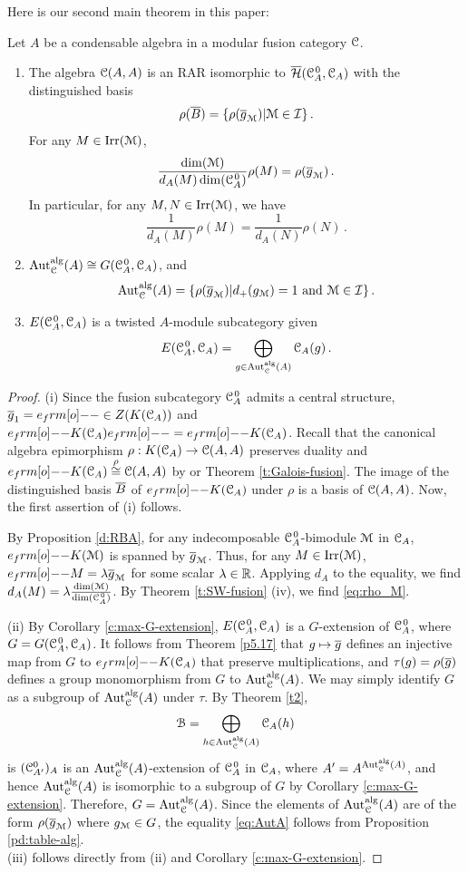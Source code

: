 \documentclass{amsart}
\begin{document}
Here is our second main theorem in this paper: 
\begin{thm}\label{t:main2}
    Let $A$ be a condensable algebra in a modular fusion category $\CC$. 
    \begin{enumerate} 
    \item The algebra $\CC(A,A)$ is an RAR isomorphic to
    $\oHA$ with the distinguished basis $$\rho(\ol B) = \{\rho(\ogm)|\MM \in\I\}\,.$$ 
    For any $M \in \irr(\MM)$, 
    \begin{equation} \label{eq:rho_M}
    \frac{\dim(\MM)}{d_A(M)\dim(\CAo)} \rho(M) = \rho(\ogm)\,.
    \end{equation}
    In particular, for any $M,N \in \irr(\MM)$, we have
    $$
\frac{1}{d_A(M)} \rho(M) = \frac{1}{d_A(N)} \rho(N)\,.
    $$
    \item  $\Auta(A) \cong G(\CAo,\CA)$, and
    \begin{equation} \label{eq:AutA}
    \Auta(A)=\{\rho(\ogm)|d_+(\gm)=1 \text{ and }\MM \in \I \} \,.
    \end{equation}
    \item $\ECA$ is a twisted $A$-module subcategory given
    $$
    \ECA = \bigoplus_{g \in \Auta(A)} \CA(g)\,.
    $$    
    \end{enumerate}
\end{thm}
\begin{proof}
(i)   Since the fusion subcategory $\CAo$ admits a central structure, ${\ol g_1} = e_\1 \in Z(\KA)$ and $e_\1 \KA e_\1 = e_\1 \KA$.  Recall that the canonical algebra epimorphism $\rho: K(\CA) \to \CC(A,A)$ preserves duality and $e_\1 \KA \stackrel{\rho}{\cong} \CC(A,A)$ by \cite{DNRX2025} or Theorem \ref{t:Galois-fusion}. The image of the distinguished basis $\ol B$ of $e_\1 \KA$ under $\rho$ is a basis of $\CC(A,A)$. Now, the first assertion of (i) follows.

By Proposition \ref{d:RBA}, for any indecomposable $\CAo$-bimodule $\MM$ in $\CA$, $e_\1 K(\MM)$ is spanned by $\ogm$. Thus, for any $M \in \irr(\MM)$, $e_\1 M = \ld \ogm$ for some scalar $\ld \in \BR$. Applying $d_A$ to the equality, we find $d_A(M) = \ld \frac{\dim(\MM)}{\dim(\CAo)}$. By Theorem \ref{t:SW-fusion} (iv),  we find \eqref{eq:rho_M}.

(ii)  By Corollary \ref{c:max-G-extension}, $E(\CAo, \CA)$ is a $G$-extension of $\CAo$, where $G=G(\CAo, \CA)$. It follows from Theorem \ref{p5.17} that $g \mapsto \ol g$ defines an injective map from $G$ to $e_\1 \KA$ that preserve multiplications, and $\tau(g) =\rho(\og)$ defines  a group monomorphism from $G$ to $\Auta(A)$. We may simply identify $G$ as a subgroup of $\Auta(A)$ under $\tau$. By Theorem \ref{t2},
$$
\BB = \bigoplus_{h \in \Auta(A)} \CA(h)
$$
is   $(\CC_{A'}^0)_A$ is an $\Auta(A)$-extension of $\CAo$ in $\CA$, where $A'=A^{\Auta(A)}$, and hence $\Auta(A)$ is isomorphic to a subgroup of $G$ by Corollary \ref{c:max-G-extension}. Therefore, $G = \Auta(A)$. Since the elements of $\Auta(A)$ are of the form $\rho(\ogm)$ where $\gm \in G$, the equality \eqref{eq:AutA} follows from Proposition \ref{pd:table-alg}.\\
(iii) follows directly from (ii) and Corollary \ref{c:max-G-extension}.
\end{proof}
\end{document}
